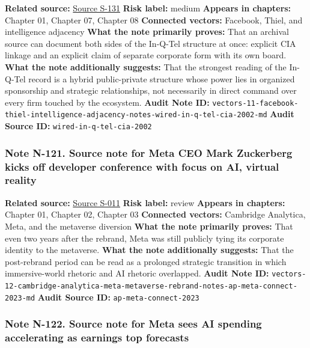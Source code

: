 \documentclass[
  american,
  11pt,
  letterpaper,
]{article}
\begin{document}
\textbf{Related source:}
\hyperref[source-s-131-it-pays-to-play-with-the-cia]{Source S-131}
\textbf{Risk label:} medium \textbf{Appears in chapters:} Chapter 01,
Chapter 07, Chapter 08 \textbf{Connected vectors:} Facebook, Thiel, and
intelligence adjacency \textbf{What the note primarily proves:} That an
archival source can document both sides of the In-Q-Tel structure at
once: explicit CIA linkage and an explicit claim of separate corporate
form with its own board. \textbf{What the note additionally suggests:}
That the strongest reading of the In-Q-Tel record is a hybrid
public-private structure whose power lies in organized sponsorship and
strategic relationships, not necessarily in direct command over every
firm touched by the ecosystem. \textbf{Audit Note ID:}
\texttt{vectors-11-facebook-thiel-intelligence-adjacency-notes-wired-in-q-tel-cia-2002-md}
\textbf{Audit Source ID:} \texttt{wired-in-q-tel-cia-2002}

\subsubsection{Note N-121. Source note for Meta CEO Mark Zuckerberg
kicks off developer conference with focus on AI, virtual
reality}\label{note-n-121-vectors-12-cambridge-analytica-meta-metaverse-rebrand-notes-ap-meta-connect-2023-md}

\textbf{Related source:}
\hyperref[source-s-011-meta-ceo-mark-zuckerberg-kicks-off-developer-conference-with-focus-on-ai-virtual-reality]{Source
S-011} \textbf{Risk label:} review \textbf{Appears in chapters:} Chapter
01, Chapter 02, Chapter 03 \textbf{Connected vectors:} Cambridge
Analytica, Meta, and the metaverse diversion \textbf{What the note
primarily proves:} That even two years after the rebrand, Meta was still
publicly tying its corporate identity to the metaverse. \textbf{What the
note additionally suggests:} That the post-rebrand period can be read as
a prolonged strategic transition in which immersive-world rhetoric and
AI rhetoric overlapped. \textbf{Audit Note ID:}
\texttt{vectors-12-cambridge-analytica-meta-metaverse-rebrand-notes-ap-meta-connect-2023-md}
\textbf{Audit Source ID:} \texttt{ap-meta-connect-2023}

\subsubsection{Note N-122. Source note for Meta sees AI spending
accelerating as earnings top
forecasts}\label{note-n-122-vectors-12-cambridge-analytica-meta-metaverse-rebrand-notes-ft-meta-ai-spending-reality-labs-2024-md}
\end{document}
